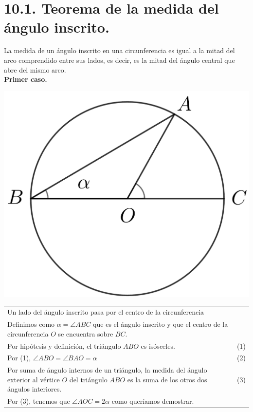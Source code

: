 \documentclass[12pt,a4paper, oneside]{book}
\begin{document}
\section{10.1. Teorema de la medida del ángulo inscrito.}
La medida de un ángulo inscrito en una circunferencia es igual a la mitad del arco comprendido entre sus lados, es decir, es la mitad del ángulo central que abre del mismo arco.
\\
\textbf{Primer caso.}
\begin{center}
\includegraphics[scale=0.6]{Imagenes/circulo.png} 
\end{center}
\begin{tabular}{p{15.9 cm} p{1cm}}
Un lado del ángulo inscrito pasa por el centro de la circunferencia 
\\Definimos como $\alpha =\angle ABC$ que es el ángulo inscrito y que el centro de la circunferencia $O$ se encuentra sobre $BC$. 
\\Por hipótesis y definición, el triángulo $ABO$ es isósceles. &(1)
\\Por (1), $\angle ABO = \angle BAO = \alpha$ &(2)
\\Por suma de ángulo internos de un triángulo, la medida del ángulo exterior al vértice $O$ del triángulo $ABO$ es la suma de los otros dos ángulos interiores. &\medskip(3)
\\Por (3), tenemos que $\angle AOC =2 \alpha$ como queríamos demostrar.
\end{tabular}\\\\
\end{document}
